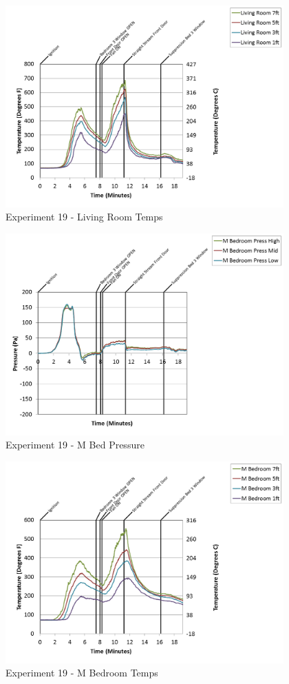 \documentclass{article}
\begin{document}
\begin{appendices}
\clearpage

\begin{figure}[h!]
	\centering
	\includegraphics[height=3.05in]{0_Images/Results_Charts/Exp_19_Charts/LivingRoomTemps.png}
	\caption{Experiment 19 - Living Room Temps}
\end{figure}


\begin{figure}[h!]
	\centering
	\includegraphics[height=3.05in]{0_Images/Results_Charts/Exp_19_Charts/MBedPressure.png}
	\caption{Experiment 19 - M Bed Pressure}
\end{figure}

\clearpage

\begin{figure}[h!]
	\centering
	\includegraphics[height=3.05in]{0_Images/Results_Charts/Exp_19_Charts/MBedroomTemps.png}
	\caption{Experiment 19 - M Bedroom Temps}
\end{figure}



\end{appendices}
\end{document}
